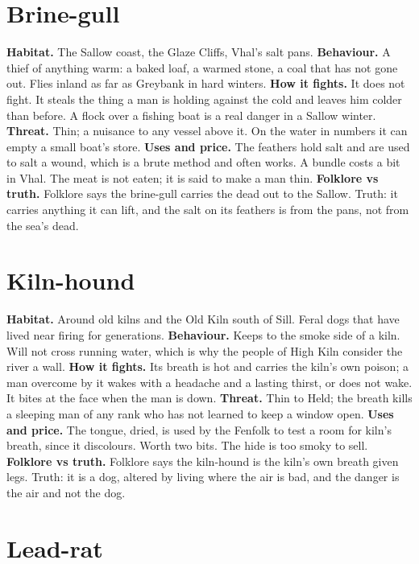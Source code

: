 \documentclass{design/chronicle}
\begin{document}
\section*{Brine-gull}

\textbf{Habitat.} The Sallow coast, the Glaze Cliffs, Vhal’s salt pans. \textbf{Behaviour.} A thief of anything warm: a baked loaf, a warmed stone, a coal that has not gone out. Flies inland as far as Greybank in hard winters. \textbf{How it fights.} It does not fight. It steals the thing a man is holding against the cold and leaves him colder than before. A flock over a fishing boat is a real danger in a Sallow winter. \textbf{Threat.} Thin; a nuisance to any vessel above it. On the water in numbers it can empty a small boat’s store. \textbf{Uses and price.} The feathers hold salt and are used to salt a wound, which is a brute method and often works. A bundle costs a bit in Vhal. The meat is not eaten; it is said to make a man thin. \textbf{Folklore vs truth.} Folklore says the brine-gull carries the dead out to the Sallow. Truth: it carries anything it can lift, and the salt on its feathers is from the pans, not from the sea’s dead.

\section*{Kiln-hound}

\textbf{Habitat.} Around old kilns and the Old Kiln south of Sill. Feral dogs that have lived near firing for generations. \textbf{Behaviour.} Keeps to the smoke side of a kiln. Will not cross running water, which is why the people of High Kiln consider the river a wall. \textbf{How it fights.} Its breath is hot and carries the kiln’s own poison; a man overcome by it wakes with a headache and a lasting thirst, or does not wake. It bites at the face when the man is down. \textbf{Threat.} Thin to Held; the breath kills a sleeping man of any rank who has not learned to keep a window open. \textbf{Uses and price.} The tongue, dried, is used by the Fenfolk to test a room for kiln’s breath, since it discolours. Worth two bits. The hide is too smoky to sell. \textbf{Folklore vs truth.} Folklore says the kiln-hound is the kiln’s own breath given legs. Truth: it is a dog, altered by living where the air is bad, and the danger is the air and not the dog.

\section*{Lead-rat}
\end{document}
